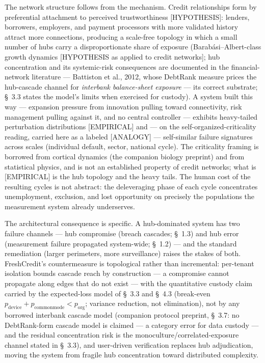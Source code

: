 \documentclass[11pt,twocolumn]{article}
\begin{document}
The network structure follows from the mechanism. Credit relationships form by preferential attachment to perceived trustworthiness [HYPOTHESIS]: lenders, borrowers, employers, and payment processors with more validated history attract more connections, producing a scale-free topology in which a small number of hubs carry a disproportionate share of exposure (Barab\'asi--Albert-class growth dynamics [HYPOTHESIS as applied to credit networks]; hub concentration and its systemic-risk consequences are documented in the financial-network literature --- Battiston et al., 2012, whose DebtRank measure prices the hub-cascade channel for \emph{interbank balance-sheet exposure} --- its correct substrate; \S~3.3 states the model's limits when exercised for custody). A system built this way --- expansion pressure from innovation pulling toward connectivity, risk management pulling against it, and no central controller --- exhibits heavy-tailed perturbation distributions [EMPIRICAL] and --- on the self-organized-criticality reading, carried here as a labeled [ANALOGY] --- self-similar failure signatures across scales (individual default, sector, national cycle). The criticality framing is borrowed from cortical dynamics (the companion biology preprint) and from statistical physics, and is not an established property of credit networks; what is [EMPIRICAL] is the hub topology and the heavy tails. The human cost of the resulting cycles is not abstract: the deleveraging phase of each cycle concentrates unemployment, exclusion, and lost opportunity on precisely the populations the measurement system already underserves.

The architectural consequence is specific. A hub-dominated system has two failure channels --- hub compromise (breach cascades; \S~1.3) and hub error (measurement failure propagated system-wide; \S~1.2) --- and the standard remediation (larger perimeters, more surveillance) raises the stakes of both. FreshCredit's countermeasure is topological rather than incremental: per-tenant isolation bounds cascade reach by construction --- a compromise cannot propagate along edges that do not exist --- with the quantitative custody claim carried by the expected-loss model of \S~3.3 and \S~4.3 (break-even $p_{\mathrm{device}} + p_{\mathrm{commonmode}} < p_{\mathrm{org}}$; variance reduction, not elimination), not by any borrowed interbank cascade model (companion protocol preprint, \S~3.7: no DebtRank-form cascade model is claimed --- a category error for data custody --- and the residual concentration risk is the monoculture/correlated-exposure channel stated in \S~3.3), and user-driven verification replaces hub adjudication, moving the system from fragile hub concentration toward distributed complexity.
\end{document}
